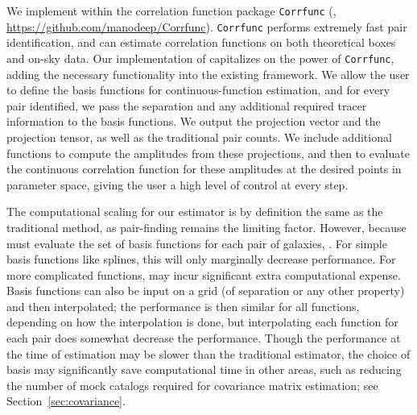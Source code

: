 We implement \est within the correlation function package \texttt{Corrfunc} (\citealt{SinhaGarrison2019,Sinha2020}, \url{https://github.com/manodeep/Corrfunc}).
\texttt{Corrfunc} performs extremely fast pair identification, and can estimate correlation functions on both theoretical boxes and on-sky data.
Our implementation of \est capitalizes on the power of \texttt{Corrfunc}, adding the necessary functionality into the existing framework.
We allow the user to define the basis functions for continuous-function estimation, and for every pair identified, we pass the separation and any additional required tracer information to the basis functions.
We output the projection vector and the projection tensor, as well as the traditional pair counts.
We include additional functions to compute the amplitudes from these projections, and then to evaluate the continuous correlation function for these amplitudes at the desired points in parameter space, giving the user a high level of control at every step.

The computational scaling for our estimator is by definition the same as the traditional method, as pair-finding remains the limiting factor.
However, because \est must evaluate the set of basis functions for each pair of galaxies, .
For simple basis functions like splines, this will only marginally decrease performance.
For more complicated functions, \est may incur significant extra computational expense.
Basis functions can also be input on a grid (of separation or any other property) and then interpolated; the performance is then similar for all functions, depending on how the interpolation is done, but interpolating each function for each pair does somewhat decrease the performance.
Though the performance at the time of estimation may be slower than the traditional estimator, the choice of basis may significantly save computational time in other areas, such as reducing the number of mock catalogs required for covariance matrix estimation; see Section~\ref{sec:covariance}.

